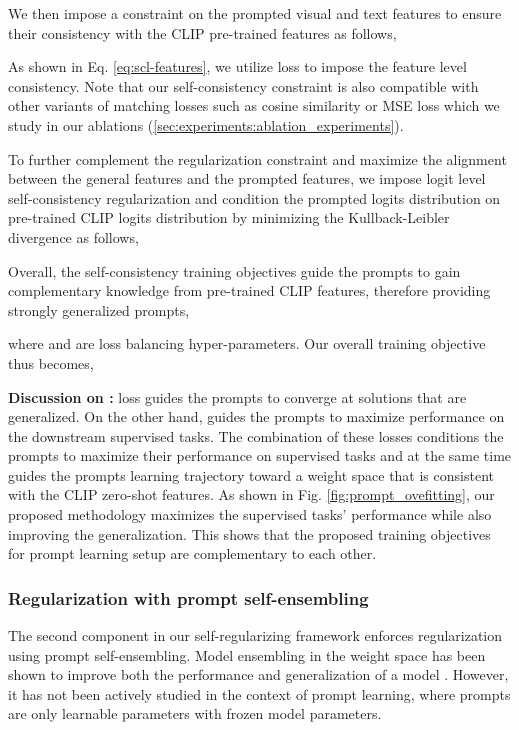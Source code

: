 \documentclass[10pt,twocolumn,letterpaper]{article}
\begin{document}
We then impose a constraint on the prompted visual and text features to ensure their consistency with the CLIP pre-trained features as follows,

As shown in Eq. \ref{eq:scl-features}, we utilize  loss to impose the feature level consistency. Note that our self-consistency constraint is also compatible with other variants of matching losses such as cosine similarity or MSE loss which we study in our ablations (\autoref{sec:experiments:ablation_experiments}).

To further complement the regularization constraint and maximize the alignment between the general features and the prompted features, we impose logit level self-consistency regularization and condition the prompted logits distribution on pre-trained CLIP logits distribution by minimizing the Kullback-Leibler divergence as follows,


Overall, the self-consistency training objectives guide the prompts to gain complementary  knowledge from pre-trained CLIP features, therefore providing strongly generalized prompts,

where  and  are loss balancing hyper-parameters. Our overall training objective thus becomes,


\noindent \textbf{Discussion on :}
 loss guides the prompts to converge at solutions that are generalized. On the other hand,  guides the prompts to maximize performance on the downstream supervised tasks. The combination of these losses conditions the prompts to maximize their performance on supervised tasks and at the same time guides the prompts learning trajectory toward a weight space that is consistent with the CLIP zero-shot features. As shown in Fig. \ref{fig:prompt_ovefitting}, our proposed methodology maximizes the supervised tasks' performance while also improving the generalization. This shows that the proposed training objectives for prompt learning setup are complementary to each other. 

\subsubsection{Regularization with prompt self-ensembling}
\label{GPA_para}
The second component in our self-regularizing framework enforces regularization using prompt self-ensembling. Model ensembling in the weight space has been shown to improve both the performance and generalization of a model \cite{wortsman2022robust, ilharco2022patching}. However, it has not been actively studied in the context of prompt learning, where prompts are only learnable parameters with frozen model parameters. 
\end{document}
